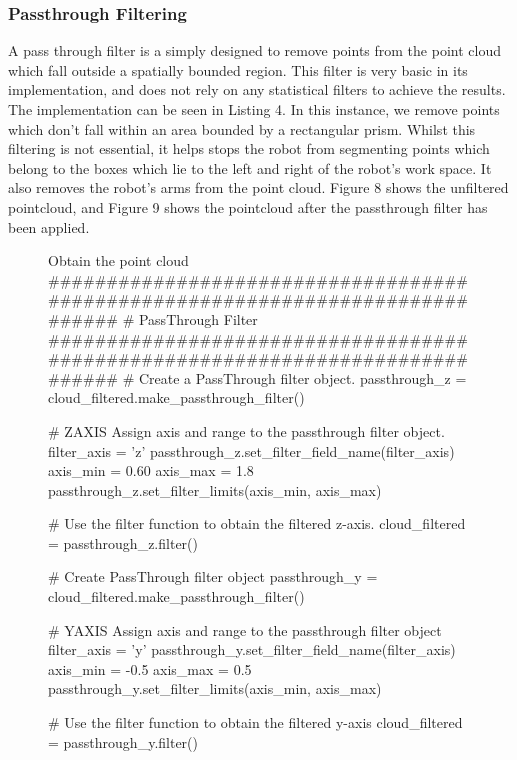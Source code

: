 \documentclass[a4paper]{article}
\begin{document}
\newpage

\subsubsection{Passthrough Filtering}
A pass through filter is a simply designed to remove points from the point cloud which fall outside a spatially bounded region. This filter is very basic in its implementation, and does not rely on any statistical filters to achieve the results. The implementation can be seen in Listing 4. In this instance, we remove points which don't fall within an area bounded by a rectangular prism. Whilst this filtering is not essential, it helps stops the robot from segmenting points which belong to the boxes which lie to the left and right of the robot's work space. It also removes the robot's arms from the point cloud. Figure 8 shows the unfiltered pointcloud, and Figure 9 shows the pointcloud after the passthrough filter has been applied.

\vspace{1cm}

\begin{figure}[h]\scriptsize
\begin{sexylisting}{Obtain the point cloud}
##############################################################################
    # PassThrough Filter
##############################################################################
    # Create a PassThrough filter object.
    passthrough_z = cloud_filtered.make_passthrough_filter()

    # ZAXIS Assign axis and range to the passthrough filter object.
    filter_axis = 'z'
    passthrough_z.set_filter_field_name(filter_axis)
    axis_min = 0.60
    axis_max = 1.8
    passthrough_z.set_filter_limits(axis_min, axis_max)

    # Use the filter function to obtain the filtered z-axis.
    cloud_filtered = passthrough_z.filter()

    # Create PassThrough filter object
    passthrough_y = cloud_filtered.make_passthrough_filter()

    # YAXIS Assign axis and range to the passthrough filter object
    filter_axis = 'y'
    passthrough_y.set_filter_field_name(filter_axis)
    axis_min = -0.5
    axis_max = 0.5
    passthrough_y.set_filter_limits(axis_min, axis_max)

    # Use the filter function to obtain the filtered y-axis
    cloud_filtered = passthrough_y.filter()
\end{sexylisting}
\end{figure}
\end{document}
